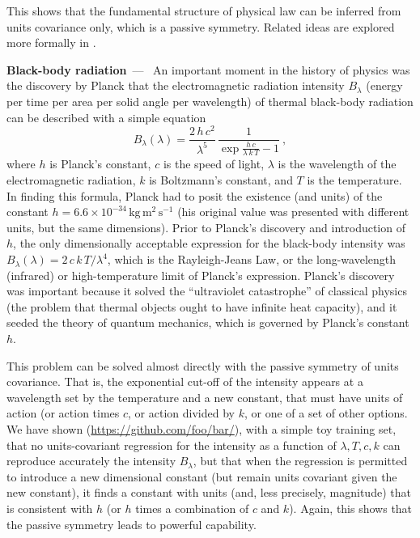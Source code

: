 \documentclass{article}
\newcommand{\unit}[1]{\mathrm{#1}}
\newcommand{\kg}{\unit{kg}}
\newcommand{\m}{\unit{m}}
\newcommand{\s}{\unit{s}}
\renewcommand{\paragraph}[1]{\par\textbf{#1}~---~}
\begin{document}
This shows that the fundamental structure of physical law can be inferred from units covariance only, which is a passive symmetry.  Related ideas are explored more formally in \cite{villar2022dimensionless}.

\paragraph{Black-body radiation}
An important moment in the history of physics was the discovery by Planck that the electromagnetic radiation intensity $B_\lambda$ (energy per time per area per solid angle per wavelength) of thermal black-body radiation can be described with a simple equation \cite{planck}
\begin{equation}
    B_\lambda(\lambda) = \frac{2\,h\,c^2}{\lambda^5}\,\frac{1}{\exp\frac{h\,c}{\lambda\,k\,T} - 1}~,
\end{equation}
where $h$ is Planck's constant,
$c$ is the speed of light,
$\lambda$ is the wavelength of the electromagnetic radiation,
$k$ is Boltzmann's constant,
and $T$ is the temperature.
In finding this formula, Planck had to posit the existence (and units) of the constant $h=6.6\times 10^{-34}\,\kg\,\m^2\,\s^{-1}$ (his original value was presented with different units, but the same dimensions).
Prior to Planck's discovery and introduction of $h$, the only dimensionally acceptable expression for the black-body intensity was $B_\lambda(\lambda)=2\,c\,k\,T/\lambda^4$, which is the Rayleigh-Jeans Law, or the long-wavelength (infrared) or high-temperature limit of Planck's expression.
Planck's discovery was important because it solved the ``ultraviolet catastrophe'' of classical physics (the problem that thermal objects ought to have infinite heat capacity), and it seeded the theory of quantum mechanics, which is governed by Planck's constant $h$.

This problem can be solved almost directly with the passive symmetry of units covariance.
That is, the exponential cut-off of the intensity appears at a wavelength set by the temperature and a new constant, that must have units of action (or action times $c$, or action divided by $k$, or one of a set of other options.
We have shown (\url{https://github.com/foo/bar/}), with a simple toy training set, that no units-covariant regression for the intensity as a function of $\lambda, T, c, k$ can reproduce accurately the intensity $B_\lambda$, but that when the regression is permitted to introduce a new dimensional constant (but remain units covariant given the new constant), it finds a constant with units (and, less precisely, magnitude) that is consistent with $h$ (or $h$ times a combination of $c$ and $k$).
Again, this shows that the passive symmetry leads to powerful capability.
\end{document}
